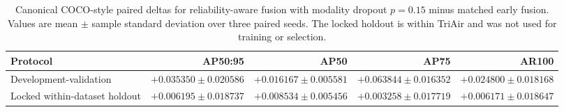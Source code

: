 \begin{table}[t]
\caption{Canonical COCO-style paired deltas for reliability-aware fusion with modality dropout $p=0.15$ minus matched early fusion. Values are mean $\pm$ sample standard deviation over three paired seeds. The locked holdout is within TriAir and was not used for training or selection.}
\label{tab:v49-coco-fixed-checkpoint-summary}
\centering
\small
\begin{tabular}{lrrrr}
\toprule
Protocol & AP50:95 & AP50 & AP75 & AR100 \\
\midrule
Development-validation & $+0.035350 \pm 0.020586$ & $+0.016167 \pm 0.005581$ & $+0.063844 \pm 0.016352$ & $+0.024800 \pm 0.018168$ \\
Locked within-dataset holdout & $+0.006195 \pm 0.018737$ & $+0.008534 \pm 0.005456$ & $+0.003258 \pm 0.017719$ & $+0.006171 \pm 0.018647$ \\
\bottomrule
\end{tabular}
\end{table}
